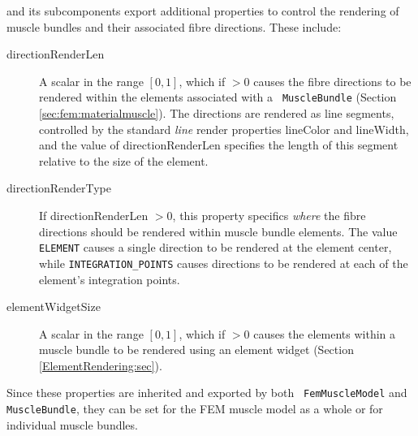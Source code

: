  and its subcomponents
 export additional
properties to control the rendering of muscle bundles and their
associated fibre directions. These include:

\begin{description}

\item[directionRenderLen]\mbox{}

A scalar in the range $[0,1]$, which if $> 0$ causes the fibre
directions to be rendered within the elements associated with a {\tt
MuscleBundle} (Section \ref{sec:fem:materialmuscle}). The directions
are rendered as line segments, controlled by the standard {\it line}
render properties {\sf lineColor} and {\sf lineWidth}, and the value
of {\sf directionRenderLen} specifies the length of this segment
relative to the size of the element.

\item[directionRenderType]\mbox{}

If {\sf directionRenderLen} $> 0$, this property specifics {\it
where} the fibre directions should be rendered within muscle bundle
elements. The value {\tt ELEMENT} causes a single direction to be
rendered at the element center, while {\tt INTEGRATION\_POINTS} causes
directions to be rendered at each of the element's integration points.

\item[elementWidgetSize]\mbox{}

A scalar in the range $[0,1]$, which if $> 0$ causes the elements
within a muscle bundle to be rendered using an element widget (Section
\ref{ElementRendering:sec}).

\end{description}

Since these properties are inherited and exported by both {\tt
FemMuscleModel} and {\tt MuscleBundle}, they can be set for the FEM
muscle model as a whole or for individual muscle bundles.

